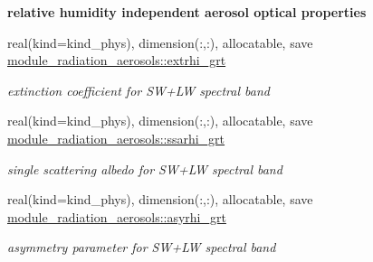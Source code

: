 \begin{Indent}\textbf{ relative humidity independent aerosol optical properties}\par
\begin{DoxyCompactItemize}
\item 
real(kind=kind\+\_\+phys), dimension(\+:,\+:), allocatable, save \hyperlink{group__module__radiation__aerosols_gacb7ff037be78e950ea42d956816c93d5}{module\+\_\+radiation\+\_\+aerosols\+::extrhi\+\_\+grt}
\begin{DoxyCompactList}\small\item\em extinction coefficient for S\+W+\+LW spectral band \end{DoxyCompactList}\item 
real(kind=kind\+\_\+phys), dimension(\+:,\+:), allocatable, save \hyperlink{group__module__radiation__aerosols_gae8587d9b4ebd9cf5d363a82d15049324}{module\+\_\+radiation\+\_\+aerosols\+::ssarhi\+\_\+grt}
\begin{DoxyCompactList}\small\item\em single scattering albedo for S\+W+\+LW spectral band \end{DoxyCompactList}\item 
real(kind=kind\+\_\+phys), dimension(\+:,\+:), allocatable, save \hyperlink{group__module__radiation__aerosols_ga4b5f80817af9f2116618d6c8f0e194de}{module\+\_\+radiation\+\_\+aerosols\+::asyrhi\+\_\+grt}
\begin{DoxyCompactList}\small\item\em asymmetry parameter for S\+W+\+LW spectral band \end{DoxyCompactList}\end{DoxyCompactItemize}
\end{Indent}
